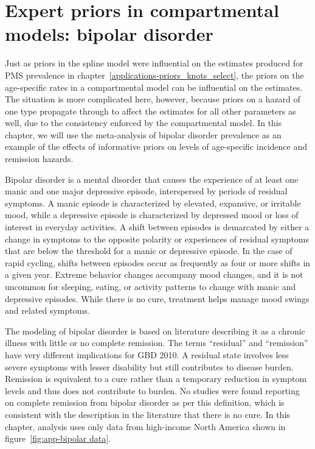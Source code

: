 \chapter{Expert priors in compartmental models: bipolar disorder}
\label{applications-prior_level_vals}

Just as priors in the spline model were influential on the estimates
produced for PMS prevalence in
chapter~\ref{applications-priors_knots_select}, the priors on the
age-specific rates in a compartmental model can be influential on the
estimates.  The situation is more complicated here, however, because
priors on a hazard of one type propagate through to affect the
estimates for all other parameters as well, due to the consistency
enforced by the compartmental model.  In this chapter, we will use the
meta-analysis of bipolar disorder prevalence as an example of the
effects of informative priors on levels of age-specific incidence and
remission hazards.

Bipolar disorder is a mental disorder that causes the experience
of at least one manic and one major depressive episode,
interspersed by periods of residual symptoms.  A manic episode is
characterized by elevated, expansive, or irritable mood, while a
depressive episode is characterized by depressed mood or loss of
interest in everyday activities.  A shift between episodes is
demarcated by either a change in symptoms to the opposite polarity
or experiences of residual symptoms that are below the threshold
for a manic or depressive episode.  In the case of rapid cycling,
shifts between episodes occur as frequently as four or more shifts
in a given year.  Extreme behavior
changes accompany mood changes, and it is not uncommon for sleeping,
eating, or activity patterns to change with manic and depressive
episodes.
While there
is no cure, treatment helps manage mood swings and related
symptoms. \cite{kloos_bipolar_2011, angst_historical_2000}

The modeling of bipolar disorder is based on literature describing it
as a chronic illness with little or no complete remission.
The terms ``residual'' and ``remission'' have very different implications
for GBD 2010.  A residual state involves less severe
symptoms with lesser disability but still contributes to disease
burden.  Remission is equivalent to a cure rather than a temporary
reduction in symptom levels and thus does not contribute to burden.  No studies
were found reporting on complete remission from bipolar disorder as per this definition,
which is consistent with the description in the literature that there
is no cure. \cite{american_psychiatric_association_diagnostic_2000}
In this chapter, analysis
uses only data from high-income North America
shown in figure~\ref{fig:app-bipolar data}.

